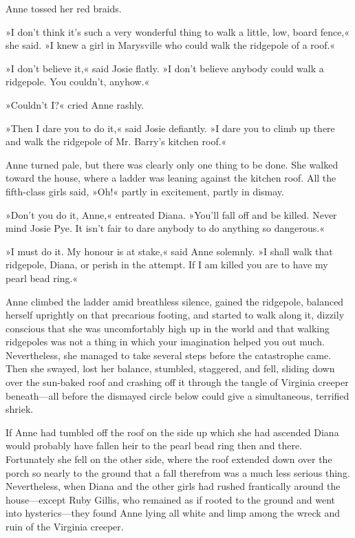 Anne tossed her red braids.

»I don't think it's such a very wonderful thing to walk a little, low, board fence,« she said. »I knew a girl in Marysville who could walk the ridgepole of a roof.«

»I don't believe it,« said Josie flatly. »I don't believe anybody could walk a ridgepole. You couldn't, anyhow.«

»Couldn't I?« cried Anne rashly.

»Then I dare you to do it,« said Josie defiantly. »I dare you to climb up there and walk the ridgepole of Mr. Barry's kitchen roof.«

Anne turned pale, but there was clearly only one thing to be done. She walked toward the house, where a ladder was leaning against the kitchen roof. All the fifth-class girls said, »Oh!« partly in excitement, partly in dismay.

»Don't you do it, Anne,« entreated Diana. »You'll fall off and be killed. Never mind Josie Pye. It isn't fair to dare anybody to do anything so dangerous.«

»I must do it. My honour is at stake,« said Anne solemnly. »I shall walk that ridgepole, Diana, or perish in the attempt. If I am killed you are to have my pearl bead ring.«

Anne climbed the ladder amid breathless silence, gained the ridgepole, balanced herself uprightly on that precarious footing, and started to walk along it, dizzily conscious that she was uncomfortably high up in the world and that walking ridgepoles was not a thing in which your imagination helped you out much. Nevertheless, she managed to take several steps before the catastrophe came. Then she swayed, lost her balance, stumbled, staggered, and fell, sliding down over the sun-baked roof and crashing off it through the tangle of Virginia creeper beneath—all before the dismayed circle below could give a simultaneous, terrified shriek.

If Anne had tumbled off the roof on the side up which she had ascended Diana would probably have fallen heir to the pearl bead ring then and there. Fortunately she fell on the other side, where the roof extended down over the porch so nearly to the ground that a fall therefrom was a much less serious thing. Nevertheless, when Diana and the other girls had rushed frantically around the house—except Ruby Gillis, who remained as if rooted to the ground and went into hysterics—they found Anne lying all white and limp among the wreck and ruin of the Virginia creeper.

